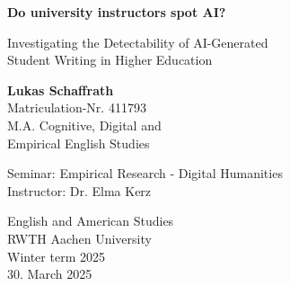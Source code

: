 \documentclass[12pt]{article}
\begin{document}
\begin{titlepage}
    \begin{center}
        \vspace*{0.5cm}
            
        \LARGE
        \textbf{Do university instructors spot AI?}
            
        \vspace{0.2cm}
        \Large
        Investigating the Detectability of AI-Generated\\
        Student Writing in Higher Education
            
        \vspace{2cm}
            
        \textbf{Lukas Schaffrath}\\
        Matriculation-Nr. 411793\\
        M.A. Cognitive, Digital and\\
        Empirical English Studies
            
        \vspace{2cm}
            
        Seminar: Empirical Research - Digital Humanities\\
        Instructor: Dr. Elma Kerz
            
        \vspace{2cm}
            
            
        \Large
        English and American Studies\\
        RWTH Aachen University\\
        Winter term 2025\\
        30. March 2025
            
    \end{center}
\end{titlepage}

\tableofcontents

\newpage
\thispagestyle{empty}
\listoffigures
\vspace{0.5cm}
\listoftables
\end{document}
